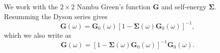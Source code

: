 \documentclass{article}
\begin{document}
We work with the $2\times2$ Nambu Green's function $\mathbf{G}$ and self-energy $\mathbf{\Sigma}$.
Resumming the Dyson series gives
\begin{equation}
\mathbf{G}(\omega) = \mathbf{G}_0(\omega)\left[1 - \mathbf{\Sigma}(\omega)\mathbf{G}_0(\omega)\right]^{-1} ,
\label{eq:d1}
\end{equation}
which we also write as
\begin{equation}
\mathbf{G}(\omega) = \left[1 - \mathbf{\Sigma}(\omega)\mathbf{G}_0(\omega)\right]^{-1} \mathbf{G}_0(\omega) .
\label{eq:d2}
\end{equation}
\end{document}
